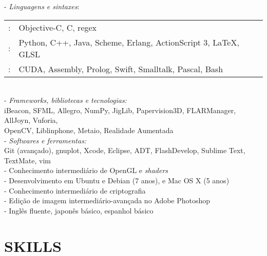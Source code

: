 \documentclass[]{res} %
\def \divspace{6pt}
\begin{document}
\begin{resume}
    - {\sl Linguagens e sintaxes}: \\
    \setlength\tabcolsep{2pt}
    \begin{tabular}{r l}
    \hspace*{1.5em}{\sl Fluente}:& Objective-C, C, regex \\
    \hspace*{1.5em}{\sl Muito Familiar}:& Python, C++, Java, Scheme, Erlang, ActionScript 3, \LaTeX, GLSL \\
    \hspace*{1.5em}{\sl Pouco Familiar}:& CUDA, Assembly, Prolog, Swift, Smalltalk, Pascal, Bash \\
    \end{tabular}
    \\
    - {\sl Frameworks, bibliotecas e tecnologias:} \\
    \hspace*{1.5em}iBeacon, SFML, Allegro, NumPy, JigLib, Papervision3D, FLARManager, AllJoyn, Vuforia, \\
    \hspace*{1.5em}OpenCV, Liblinphone, Metaio, Realidade Aumentada
    \\
    - {\sl Softwares e ferramentas:} \\
    \hspace*{1.5em}Git (avançado), gnuplot, Xcode, Eclipse, ADT, FlashDevelop, Sublime Text, TextMate, vim
    \\
    - Conhecimento intermediário de OpenGL e {\it shaders} \\
    - Desenvolvimento em Ubuntu e Debian (7 anos), e Mac OS X (5 anos) \\
    - Conhecimento intermediário de criptografia \\
    - Edição de imagem intermediário-avançada no Adobe Photoshop \\
    - Inglês fluente, japonês básico, espanhol básico
\else
    \section{SKILLS \hspace{\divspace} }


\end{resume}
\end{document}
